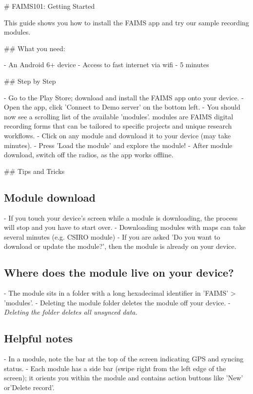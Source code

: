 
# FAIMS101: Getting Started

This guide shows you how to install the FAIMS app and try our sample recording modules.

## What you need:

-  An Android 6+ device
-  Access to fast internet via wifi
-  5 minutes



## Step by Step



-  Go to the Play Store; download and install the FAIMS app onto your device.
-  Open the app, click 'Connect to Demo server' on the bottom left.
-  You should now see a scrolling list of the available 'modules'. modules are FAIMS digital recording forms that can be tailored to specific projects and unique research workflows.
-  Click on any module and download it to your device (may take minutes).
-  Press 'Load the module' and explore the module! 
-  After module download, switch off the radios, as the app works offline.







## \tfc Tips and Tricks

\subsection{Module download}


-  If you touch your device’s screen while a module is downloading, the process will stop and you have to start over.
-  Downloading modules with maps can take several minutes (e.g. CSIRO module)
-  If you are asked 'Do you want to download or update the module?', then the module is already on your device.

\subsection{Where does the module live on your device?}


-  The module sits in a folder with a long hexadecimal identifier in 'FAIMS' > 'modules'. 
-  Deleting the module folder deletes the module off your device. 
-  {\em Deleting the folder deletes all unsynced data.}


\subsection{Helpful notes}

-  In a module, note the bar at the top of the screen indicating GPS and syncing status. 
-  Each module has a side bar (swipe right from the left edge of the screen); it orients you within the module and contains action buttons like 'New' or'Delete record'.



